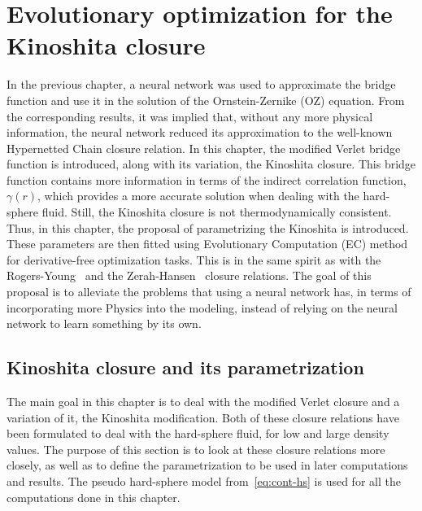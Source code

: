\chapter{Evolutionary optimization for the Kinoshita closure}
\label{Cap5}

In the previous chapter, a neural network was used to approximate the bridge function and 
use it in the solution of the Ornstein-Zernike (OZ) equation. From the corresponding 
results, it was implied that, without any more physical information, the neural network 
reduced its approximation to the well-known Hypernetted Chain closure relation. In this 
chapter, the modified Verlet bridge function is introduced, along with its variation, the 
Kinoshita closure. This bridge function contains more information in terms of the indirect 
correlation function, \(\gamma(r)\), which provides a more accurate solution when dealing 
with the hard-sphere fluid. Still, the Kinoshita closure is not thermodynamically 
consistent. Thus, in this chapter, the proposal of parametrizing the Kinoshita is 
introduced. These parameters are then fitted using Evolutionary Computation (EC) method for 
derivative-free optimization tasks. This is in the same spirit as with the 
Rogers-Young~\cite{rogersNewThermodynamicallyConsistent1984b} and the 
Zerah-Hansen~\cite{zerahSelfConsistentIntegral1986} closure relations. The goal of this 
proposal is to alleviate the problems that using a neural network has, in terms of 
incorporating more Physics into the modeling, instead of relying on the neural network to 
learn something by its own.

\section{Kinoshita closure and its parametrization}
The main goal in this chapter is to deal with the modified Verlet closure and a variation 
of it, the Kinoshita modification. Both of these closure relations have been formulated to 
deal with the hard-sphere fluid, for low and large density values. The purpose of this 
section is to look at these closure relations more closely, as well as to define the 
parametrization to be used in later computations and results.
The pseudo hard-sphere model from~\autoref{eq:cont-hs} is used for all the computations 
done in this chapter.

